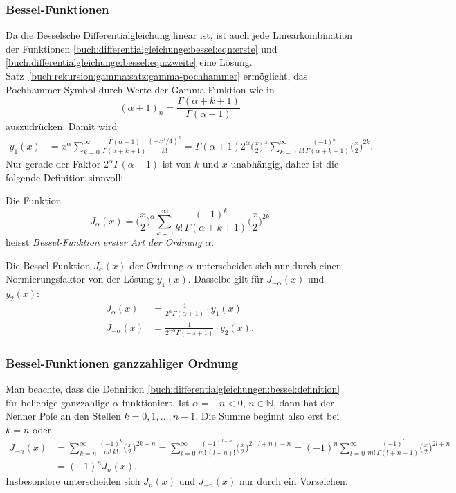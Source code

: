 %
%
\subsubsection{Bessel-Funktionen}
Da die Besselsche Differentialgleichung linear ist, ist auch
jede Linearkombination der Funktionen
\eqref{buch:differentialgleichunge:bessel:eqn:erste}
und
\eqref{buch:differentialgleichunge:bessel:eqn:zweite}
eine Lösung.
Satz~\ref{buch:rekursion:gamma:satz:gamma-pochhammer}
ermöglicht, das Pochhammer-Symbol durch Werte der Gamma-Funktion
wie in
\[
(\alpha+1)_n = \frac{\Gamma(\alpha+k+1)}{\Gamma(\alpha+1)}
\]
auszudrücken.
Damit wird
\begin{align}
y_1(x)
&=
x^\alpha
\sum_{k=0}^\infty
\frac{\Gamma(\alpha+1)}{\Gamma(\alpha+k+1)}
\frac{(-x^2/4)^k}{k!}
=
\Gamma(\alpha+1) 2^{\alpha}
\biggl(\frac{x}{2}\biggr)^\alpha
\sum_{k=0}^\infty
\frac{(-1)^k}{k!\,\Gamma(\alpha+k+1)} \biggl(\frac{x}{2}\biggr)^{2k}.
\label{buch:differentialgleichungen:bessel:normierungsgleichung}
\end{align}
Nur gerade der Faktor $2^\alpha\Gamma(\alpha+1)$ ist von $k$ und $x$ 
unabhängig, daher ist die folgende Definition sinnvoll:

\begin{definition}
\label{buch:differentialgleichungen:bessel:definition}
Die Funktion
\[
J_{\alpha}(x)
=
\biggl(\frac{x}{2}\biggr)^\alpha
\sum_{k=0}^\infty
\frac{(-1)^k}{k!\,\Gamma(\alpha+k+1)}
\biggl(\frac{x}{2}\biggr)^{2k}
\]
heisst {\em Bessel-Funktion erster Art der Ordnung $\alpha$}.
%
\end{definition}

Die Bessel-Funktion $J_\alpha(x)$ der Ordnung $\alpha$ unterscheidet sich
nur durch einen Normierungsfaktor von der Lösung $y_1(x)$.
Dasselbe gilt für $J_{-\alpha}(x)$ und $y_2(x)$:
\begin{align*}
J_{\alpha}(x)
&=
\frac{1}{2^\alpha\Gamma(\alpha+1)}
\cdot
y_1(x)
\\
J_{-\alpha}(x)
&=
\frac{1}{2^{-\alpha}\Gamma(-\alpha+1)}
\cdot
y_2(x).
\end{align*}

%
%
\subsubsection{Bessel-Funktionen ganzzahliger Ordnung}
Man beachte, dass die Definition
\ref{buch:differentialgleichungen:bessel:definition}
für beliebige ganzzahlige 
$\alpha$ funktioniert.
Ist $\alpha=-n<0$, $n\in\mathbb{N}$, dann hat der Nenner Pole 
an den Stellen $k=0,1,\dots,n-1$.
Die Summe beginnt also erst bei $k=n$ oder
\begin{align*}
J_{-n}(x)
&=
\sum_{k=n}^\infty \frac{(-1)^k}{m!\,k!}\biggl(\frac{x}{2}\biggr)^{2k-n}
=
\sum_{l=0}^\infty
\frac{(-1)^{l+n}}{m!\,(l+n)!}\biggl(\frac{x}{2}\biggr)^{2(l+n)-n}
=
(-1)^n
\sum_{l=0}^\infty
\frac{(-1)^l}{m!\,\Gamma(l+n+1)}\biggl(\frac{x}{2}\biggr)^{2l+n}
\\
&=
(-1)^n
J_{n}(x).
\end{align*}
Insbesondere unterscheiden sich $J_n(x)$ und $J_{-n}(x)$ nur durch
ein Vorzeichen.

